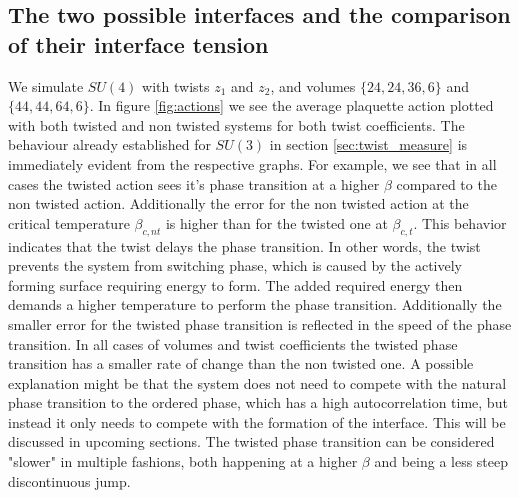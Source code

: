 \documentclass[english,twoside,openright]{UH_TCM_MSc}
\begin{document}
\subsection{The two possible interfaces and the comparison of their interface tension} \label{sec:interfaces}

We simulate $SU(4)$ with twists $z_1$ and $z_2$, and volumes $\{24,24,36,6\}$ and $\{44,44,64,6\}$. In figure \ref{fig:actions} we see the average plaquette action plotted with both twisted and non twisted systems for both twist coefficients. The behaviour already established for $SU(3)$ in section \ref{sec:twist_measure} is immediately evident from the respective graphs. For example, we see that in all cases the twisted action sees it's phase transition at a higher $\beta$ compared to the non twisted action. Additionally the error for the non twisted action at the critical temperature $\beta_{c,nt}$ is higher than for the twisted one at $\beta_{c,t}$. This behavior indicates that the twist delays the phase transition. In other words, the twist prevents the system from switching phase, which is caused by the actively forming surface requiring energy to form. The added required energy then demands a higher temperature to perform the phase transition. Additionally the smaller error for the twisted phase transition is reflected in the speed of the phase transition. In all cases of volumes and twist coefficients the twisted phase transition has a smaller rate of change than the non twisted one. A possible explanation might be that the system does not need to compete with the natural phase transition to the ordered phase, which has a high autocorrelation time, but instead it only needs to compete with the formation of the interface. This will be discussed in upcoming sections. The twisted phase transition can be considered "slower" in multiple fashions, both happening at a higher $\beta$ and being a less steep discontinuous jump.
\end{document}
